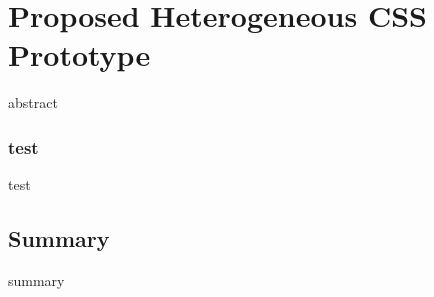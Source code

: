 \chapter{Proposed Heterogeneous CSS Prototype}
\label{chapter5}

abstract

\subsection{test}
test

\section{Summary}
summary
